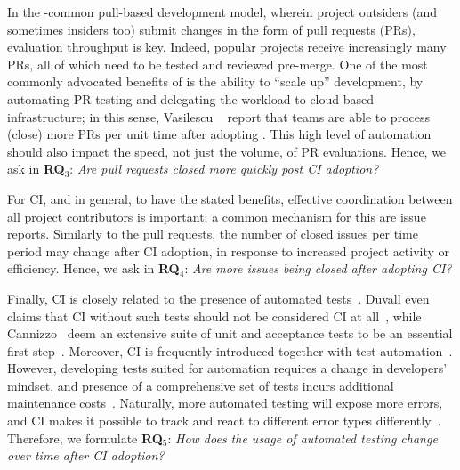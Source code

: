 In the \GH-common pull-based development model, wherein project outsiders 
(and sometimes insiders too) submit changes in the form of pull requests (PRs), 
evaluation throughput is key.
Indeed, popular \GH projects receive increasingly many PRs, all of which need 
to be tested and reviewed pre-merge.
One of the most commonly advocated benefits of \Tvis is the ability to ``scale up'' 
development, by automating PR testing and delegating the workload to cloud-based
infrastructure; in this sense, Vasilescu \etal~\cite{VasilescuYWDF15} report that 
\GH teams are able to process (\ie close) more PRs per unit time after adopting \Tvis.
This high level of automation should also impact the speed, not just the volume, of
PR evaluations.
Hence, we ask in \textbf{RQ$_3$}: 
\emph{Are pull requests closed more quickly post CI adoption?}

For CI, and \DO in general, to have the stated benefits, effective coordination
between all project contributors is important; a common mechanism for this
are issue reports.
Similarly to the pull requests, the number of closed issues per time period may change 
after CI adoption, in response to
increased project activity or efficiency. %
Hence, we ask in \textbf{RQ$_4$}: 
\emph{Are more issues being closed after adopting CI?}

Finally, CI is closely related to the presence of automated tests~\cite{Fowler}. 
Duvall even claims that CI without such tests should not be considered CI 
at all~\cite{Duvall}, while Cannizzo \etal~deem an extensive 
suite of unit and acceptance tests to be an essential first step~\cite{CannizzoCluttonRamesh}. 
Moreover, CI is frequently introduced together with test automation~\cite{Yuksel}.
However, developing tests suited for automation requires a change in developers' 
mindset, and presence of a comprehensive set of tests incurs additional maintenance 
costs~\cite{CoramBohner}.
Naturally, more automated testing will expose more errors, and CI makes it possible 
to track and react to different error types differently~\cite{BellerGZ16}.
Therefore, we formulate \textbf{RQ$_5$}: 
\emph{How does the usage of automated testing change over time after CI adoption?} 

